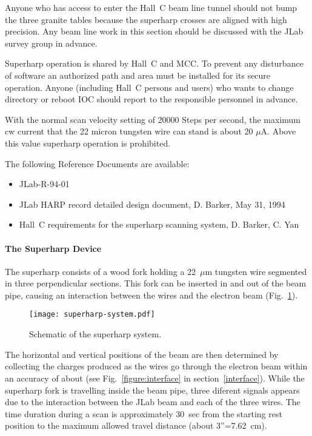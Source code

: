 Anyone who has access to enter the Hall~C beam line tunnel should
not bump the three granite tables because the superharp
crosses are aligned with high precision. Any beam line work in this
section should be discussed with the JLab survey group in advance.

Superharp operation is shared by Hall~C and MCC. To prevent any
disturbance of software an authorized path and area must be
installed for its secure operation. Anyone (including Hall~C persons
and users) who wants to change directory or reboot IOC should
report to the responsible personnel
in advance.

With the normal scan velocity setting of 20000 Steps per second, the
maximum cw current that the 22 micron tungsten wire can stand is about
20 $\mu$A. Above this value superharp operation is prohibited.

The following Reference Documents are available:
\begin{itemize}
\item{JLab-R-94-01}
\item{JLab HARP record detailed design document, D. Barker, May 31, 1994}
\item{Hall~C requirements for the superharp scanning system, D.
Barker, C. Yan}
\end{itemize}


\paragraph{The Superharp Device}\label{system}

The superharp consists of a wood fork holding a 22~$\mu$m tungsten wire segmented in three
perpendicular sections. This fork can be inserted in and out of the beam pipe, causing an
interaction between the wires and the electron beam (Fig.~\ref{figure:superharp}).


\begin{figure}[!hbt]
\begin{center}
\texttt{[image: superharp-system.pdf]}
\caption{Schematic of the superharp system.}
\label{figure:superharp}
\end{center}
\end{figure}

The horizontal and vertical positions of the beam are then determined by collecting the charges
produced as the wires go through the electron beam within an accuracy of about 
(see Fig.~\ref{figure:interface} in section~\ref{interface}). While the superharp fork
is travelling inside the beam pipe, three diferent signals appears due to the interaction
between the JLab beam and each of the three wires. The time duration during a scan is
approximately 30~sec from the starting rest position to the maximum allowed travel distance
(about 3''=7.62~cm).

